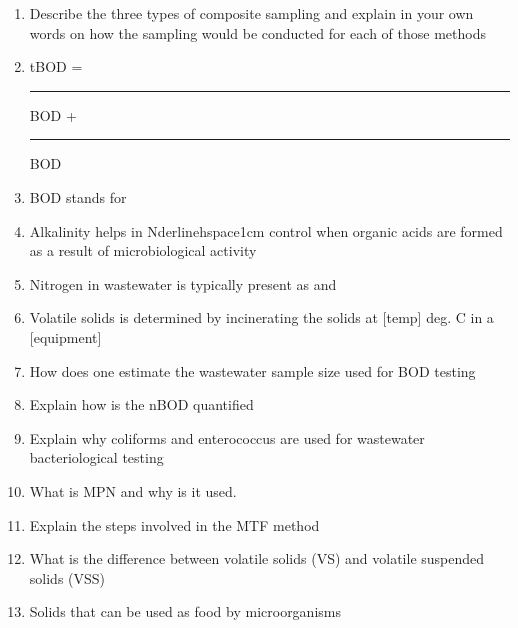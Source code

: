 \begin{enumerate}
\item  Describe the three types of composite sampling and explain in your own words on how the sampling would be conducted for each of those methods \\


\item  tBOD = \rule{.5cm}{0.3mm}BOD + \rule{0.5cm}{0.3mm}BOD

\item  BOD stands for \\

\item  Alkalinity helps in {Nderline{hspace{1cm}}} control when organic acids are formed as a result of microbiological activity \\

\item  Nitrogen in wastewater is typically present as {\underline{\hspace{1cm}}} and {\underline{\hspace{1cm}}} \\


\item  Volatile solids is determined by incinerating the solids at {\underline{\hspace{1cm}}} [temp] deg. C in a {\underline{\hspace{1cm}}} [equipment] 

\item How does one estimate the wastewater sample size used for BOD testing \\

\item Explain how is the nBOD quantified \\

\item Explain why coliforms and enterococcus are used for wastewater bacteriological testing \\

\item What is MPN and why is it used. \\

\item Explain the steps involved in the MTF method\\

\item What is the difference between volatile solids (VS) and volatile suspended solids (VSS) \\

\item Solids that can be used as food by microorganisms \\


\end{enumerate}
